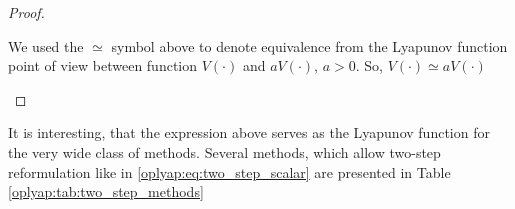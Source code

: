 \documentclass[a4paper,11pt]{article}
\begin{document}
\begin{proof}
\begin{enumerate}
\begin{itemize}
 We used the $\simeq$ symbol above to denote equivalence from the Lyapunov function point of view between function $V(\cdot)$ and $aV(\cdot)$, $a > 0$. So, $V(\cdot) \simeq aV(\cdot)$
 \end{itemize} 
\end{enumerate} 
\end{proof}

It is interesting, that the expression above serves as the Lyapunov function for the very wide class of methods. Several methods, which allow two-step reformulation like in \eqref{oplyap:eq:two_step_scalar} are presented in Table \ref{oplyap:tab:two_step_methods}

\begin{table}[t]
 \centering
 \caption{Reformulation of first-order methods with general parameters in the format given in theorem \ref{oplyap:th:scalar_lyapunov}}
 \label{oplyap:tab:two_step_scalar}
\end{table}
\end{document}
